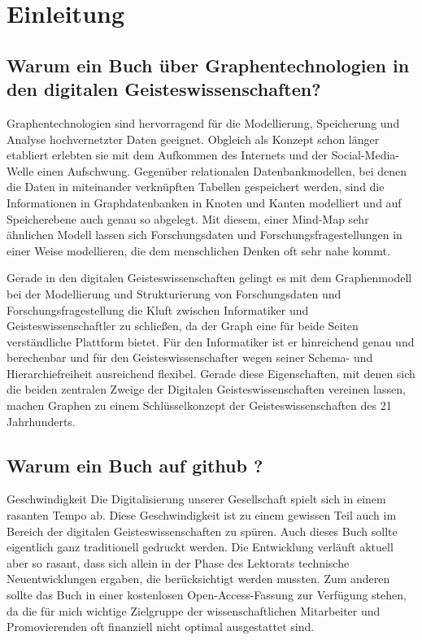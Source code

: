 \hypertarget{einleitung}{%
\section{Einleitung}\label{einleitung}}

\hypertarget{warum-ein-buch-uxfcber-graphentechnologien-in-den-digitalen-geisteswissenschaften}{%
\subsection{Warum ein Buch über Graphentechnologien in den digitalen
Geisteswissenschaften?}\label{warum-ein-buch-uxfcber-graphentechnologien-in-den-digitalen-geisteswissenschaften}}

Graphentechnologien sind hervorragend für die Modellierung, Speicherung
und Analyse hochvernetzter Daten geeignet. Obgleich als Konzept schon
länger etabliert erlebten sie mit dem Aufkommen des Internets und der
Social-Media-Welle einen Aufschwung. Gegenüber relationalen
Datenbankmodellen, bei denen die Daten in miteinander verknüpften
Tabellen gespeichert werden, sind die Informationen in Graphdatenbanken
in Knoten und Kanten modelliert und auf Speicherebene auch genau so
abgelegt. Mit diesem, einer Mind-Map sehr ähnlichen Modell lassen sich
Forschungsdaten und Forschungsfragestellungen in einer Weise
modellieren, die dem menschlichen Denken oft sehr nahe kommt.

Gerade in den digitalen Geisteswissenschaften gelingt es mit dem
Graphenmodell bei der Modellierung und Strukturierung von
Forschungsdaten und Forschungsfragestellung die Kluft zwischen
Informatiker und Geisteswissenschaftler zu schließen, da der Graph eine
für beide Seiten verständliche Plattform bietet. Für den Informatiker
ist er hinreichend genau und berechenbar und für den
Geisteswissenschafter wegen seiner Schema- und Hierarchiefreiheit
ausreichend flexibel. Gerade diese Eigenschaften, mit denen sich die
beiden zentralen Zweige der Digitalen Geisteswissenschaften vereinen
lassen, machen Graphen zu einem Schlüsselkonzept der
Geisteswissenschaften des 21 Jahrhunderts.

\hypertarget{warum-ein-buch-auf-github}{%
\subsection{Warum ein Buch auf github
?}\label{warum-ein-buch-auf-github}}

Geschwindigkeit Die Digitalisierung unserer Gesellschaft spielt sich in
einem rasanten Tempo ab. Diese Geschwindigkeit ist zu einem gewissen
Teil auch im Bereich der digitalen Geisteswissenschaften zu spüren. Auch
dieses Buch sollte eigentlich ganz traditionell gedruckt werden. Die
Entwicklung verläuft aktuell aber so rasant, dass sich allein in der
Phase des Lektorats technische Neuentwicklungen ergaben, die
berücksichtigt werden mussten. Zum anderen sollte das Buch in einer
kostenlosen Open-Access-Fassung zur Verfügung stehen, da die für mich
wichtige Zielgruppe der wissenschaftlichen Mitarbeiter und
Promovierenden oft finanziell nicht optimal ausgestattet sind.


